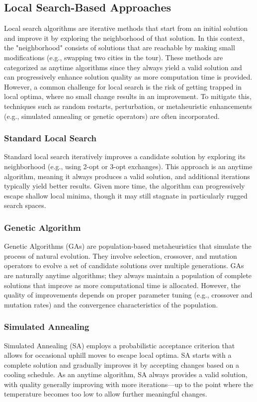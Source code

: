 \documentclass[11pt]{article}
\begin{document}
	\subsection{Local Search-Based Approaches}
	Local search algorithms are iterative methods that start from an initial solution and improve it by exploring the neighborhood of that solution. In this context, the "neighborhood" consists of solutions that are reachable by making small modifications (e.g., swapping two cities in the tour). These methods are categorized as anytime algorithms since they always yield a valid solution and can progressively enhance solution quality as more computation time is provided. However, a common challenge for local search is the risk of getting trapped in local optima, where no small change results in an improvement. To mitigate this, techniques such as random restarts, perturbation, or metaheuristic enhancements (e.g., simulated annealing or genetic operators) are often incorporated.
	
	\subsubsection{Standard Local Search}
	Standard local search iteratively improves a candidate solution by exploring its neighborhood (e.g., using 2-opt or 3-opt exchanges). This approach is an anytime algorithm, meaning it always produces a valid solution, and additional iterations typically yield better results. Given more time, the algorithm can progressively escape shallow local minima, though it may still stagnate in particularly rugged search spaces.
	
	\subsubsection{Genetic Algorithm}
	Genetic Algorithms (GAs) are population-based metaheuristics that simulate the process of natural evolution. They involve selection, crossover, and mutation operators to evolve a set of candidate solutions over multiple generations. GAs are naturally anytime algorithms; they always maintain a population of complete solutions that improve as more computational time is allocated. However, the quality of improvements depends on proper parameter tuning (e.g., crossover and mutation rates) and the convergence characteristics of the population.
	
	\subsubsection{Simulated Annealing}
	Simulated Annealing (SA) employs a probabilistic acceptance criterion that allows for occasional uphill moves to escape local optima. SA starts with a complete solution and gradually improves it by accepting changes based on a cooling schedule. As an anytime algorithm, SA always provides a valid solution, with quality generally improving with more iterations—up to the point where the temperature becomes too low to allow further meaningful changes.
	
\end{document}

